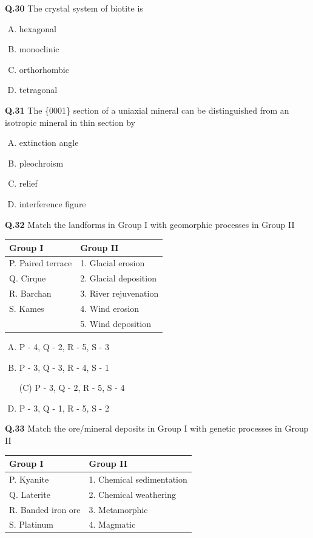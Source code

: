 \textbf{Q.30} The crystal system of biotite is
\begin{multicols}{4}
\begin{enumerate}[(A)]
\item hexagonal \item  monoclinic \item  orthorhombic \item  tetragonal
\end{enumerate}
\end{multicols}

\textbf{Q.31} The \{0001\} section of a uniaxial mineral can be distinguished from an isotropic mineral in thin section by
\begin{enumerate}[(A)]
\item extinction angle \item  pleochroism \item  relief \item  interference figure
\end{enumerate}

\textbf{Q.32} Match the landforms in Group I with geomorphic processes in Group II

\begin{center}
\begin{tabular}{ll}
Group I & Group II \\
\hline
P. Paired terrace & 1. Glacial erosion \\
Q. Cirque & 2. Glacial deposition \\
R. Barchan & 3. River rejuvenation \\
S. Kames & 4. Wind erosion \\
& 5. Wind deposition \\
\end{tabular}
\end{center}

\begin{enumerate}[(A)]
\item P - 4, Q - 2, R - 5, S - 3 \item  P - 3, Q - 3, R - 4, S - 1
\item[(C)] P - 3, Q - 2, R - 5, S - 4 \item  P - 3, Q - 1, R - 5, S - 2
\end{enumerate}

\textbf{Q.33} Match the ore/mineral deposits in Group I with genetic processes in Group II

\begin{center}
\begin{tabular}{ll}
Group I & Group II \\
\hline
P. Kyanite & 1. Chemical sedimentation \\
Q. Laterite & 2. Chemical weathering \\
R. Banded iron ore & 3. Metamorphic \\
S. Platinum & 4. Magmatic \\
\end{tabular}
\end{center}

